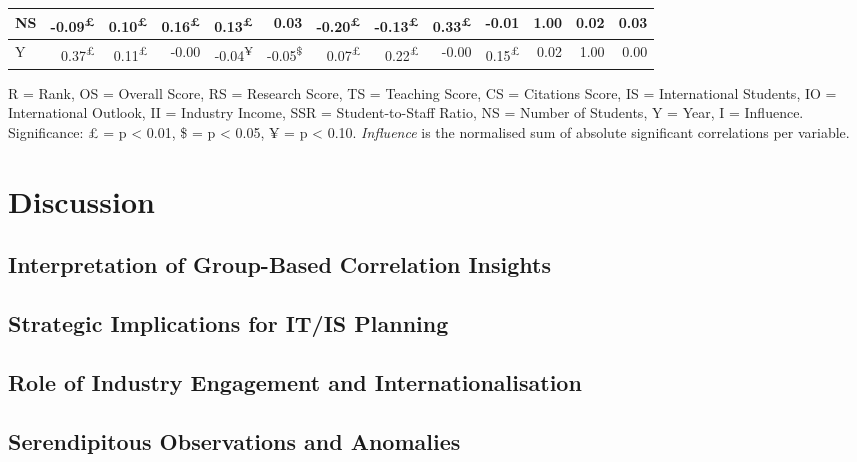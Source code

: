 \documentclass{singlecol-new}
\theoremstyle{TH}{
\newtheorem{lemma}{Lemma}
\newtheorem{theorem}[lemma]{Theorem}
\newtheorem{corrolary}[lemma]{Corrolary}
\newtheorem{conjecture}[lemma]{Conjecture}
\newtheorem{proposition}[lemma]{Proposition}
\newtheorem{claim}[lemma]{Claim}
\newtheorem{stheorem}[lemma]{Wrong Theorem}
\newtheorem{algorithm}{Algorithm}
}
\theoremstyle{THrm}{
\newtheorem{definition}{Definition}[section]
\newtheorem{question}{Question}[section]
\newtheorem{remark}{Remark}
\newtheorem{scheme}{Scheme}
}
\theoremstyle{THhit}{
\newtheorem{case}{Case}[section]
}
\begin{document}
\begin{table*}[h!]
\begin{tabular}{|l|r|r|r|r|r|r|r|r|r|r|r|r|}
		NS & \cellcolor{gray!4}-0.09\textsuperscript{£} & \cellcolor{gray!5}0.10\textsuperscript{£} & \cellcolor{gray!8}0.16\textsuperscript{£} & \cellcolor{gray!6}0.13\textsuperscript{£} & \cellcolor{gray!1}0.03 & \cellcolor{gray!10}-0.20\textsuperscript{£} & \cellcolor{gray!6}-0.13\textsuperscript{£} & \cellcolor{gray!16}0.33\textsuperscript{£} & \cellcolor{gray!0}-0.01 & \cellcolor{gray!50}1.00 & \cellcolor{gray!1}0.02 & 0.03 \\ \hline
		
		Y & \cellcolor{gray!18}0.37\textsuperscript{£} & \cellcolor{gray!5}0.11\textsuperscript{£} & \cellcolor{gray!0}-0.00 & \cellcolor{gray!2}-0.04\textsuperscript{¥} & \cellcolor{gray!2}-0.05\textsuperscript{\$} & \cellcolor{gray!3}0.07\textsuperscript{£} & \cellcolor{gray!11}0.22\textsuperscript{£} & \cellcolor{gray!0}-0.00 & \cellcolor{gray!7}0.15\textsuperscript{£} & \cellcolor{gray!1}0.02 & \cellcolor{gray!50}1.00 & 0.00 \\ \hline
	\end{tabular}
	\vspace{1mm}
	
\scriptsize
R = Rank, OS = Overall Score, RS = Research Score, TS = Teaching Score, CS = Citations Score, IS = International Students, IO = International Outlook, II = Industry Income, SSR = Student-to-Staff Ratio, NS = Number of Students, Y = Year, I = Influence. Significance: £ = p < 0.01, \$ = p < 0.05, ¥ = p < 0.10. \textit{Influence} is the normalised sum of absolute significant correlations per variable.

\end{table*}


\section{Discussion}
\subsection{Interpretation of Group-Based Correlation Insights}
\subsection{Strategic Implications for IT/IS Planning}
\subsection{Role of Industry Engagement and Internationalisation}
\subsection{Serendipitous Observations and Anomalies}
\end{document}
